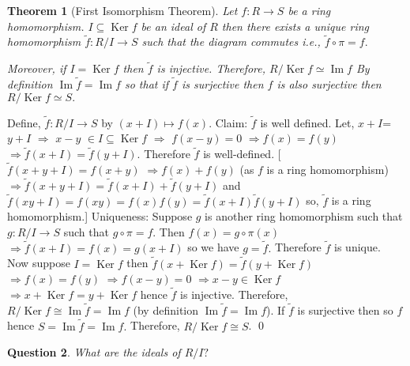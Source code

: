 \documentclass[11pt]{amsart}
\newtheorem{theorem}{Theorem}[section]
\newtheorem{qns}[theorem]{Question}
\begin{document}
\begin{theorem}[First Isomorphism Theorem]
Let $f:R\rightarrow S$ be a ring homomorphism. $I\subseteq \operatorname{Ker}f$ be an ideal of $R$ then there exists a unique ring homomorphism $\tilde{f}:R/I\rightarrow S$ such that the diagram commutes i.e., $\tilde{f}\circ \pi=f.$\\
\begin{center}
\end{center} 
Moreover, if $I=\operatorname{Ker}f$ then $\tilde{f}$ is injective. Therefore, $R/\operatorname{Ker}f \simeq \operatorname{Im}f$ 
\newline By definition $\operatorname{Im}\tilde{f}=\operatorname{Im}f$ so that if $\tilde{f}$ is surjective then $f$ is also surjective then $R/\operatorname{Ker}f \simeq S.$ 
\end{theorem}
\proof Define, $\tilde{f}:R/I\rightarrow S$ by $(x+I)\mapsto f(x).$ Claim: $\tilde{f}$ is well defined. Let, $x+I$=$y+I$ $\Rightarrow$ $x-y$ $\in I\subseteq \operatorname{Ker}f$ $\Rightarrow$ $f(x-y)=0$ $\Rightarrow f(x)=f(y)$ $\Rightarrow \tilde{f}(x+I)=\tilde{f}(y+I).$ Therefore $\tilde{f}$ is well-defined. [$\tilde{f}(x+y+I)=f(x+y)$ $\Rightarrow f(x)+f(y)$ (as $f$ is a ring homomorphism) $\Rightarrow \tilde{f}(x+y+I)=\tilde{f}(x+I)+\tilde{f}(y+I)$
and $\tilde{f}(xy+I)=f(xy)=f(x)f(y)=\tilde{f}(x+I)\tilde{f}(y+I)$ so, $\tilde{f}$ is a ring homomorphism.] Uniqueness: Suppose $g$ is another ring homomorphism such that $g:R/I\rightarrow S$ such that $g\circ\pi=f.$ Then $f(x)=g\circ\pi(x)$ $\Rightarrow \tilde{f}(x+I)=f(x)=g(x+I)$ so we have $g=\tilde{f}.$ Therefore $\tilde{f}$ is unique. Now suppose $I=\operatorname{Ker}f$ then $\tilde{f}(x+ \operatorname{Ker}f)=\tilde{f}(y+ \operatorname{Ker}f)$ $\Rightarrow f(x)=f(y)$ $\Rightarrow f(x-y)=0$ $\Rightarrow x-y \in \operatorname{Ker}f$ $\Rightarrow x+ \operatorname{Ker}f=y+ \operatorname{Ker}f$ hence $\tilde{f}$ is injective. Therefore, $R/\operatorname{Ker}f \cong \operatorname{Im}\tilde{f}=\operatorname{Im}{f}$ (by definition $\operatorname{Im}\tilde{f}=\operatorname{Im}{f}$). If $\tilde{f}$ is surjective then so $f$ hence $S=\operatorname{Im}\tilde{f}=\operatorname{Im}{f}.$ Therefore, $R/\operatorname{Ker}f \cong S$.  \qed
\begin{qns}
What are the ideals of $R/I?$
\end{qns}
\end{document}

